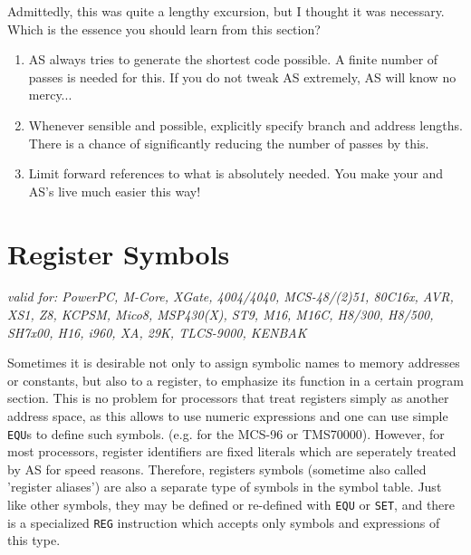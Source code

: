\documentclass[12pt,twoside]{report}
\makeatletter
\newcommand{\tty}[1]{{\tt #1}}
\newcommand{\ttindex}[1]{\index{#1@{\tt #1}}}
\makeatother
\begin{document}
Admittedly, this was quite a lengthy excursion, but I thought it was
necessary.  Which is the essence you should learn from this section?
\begin{enumerate}
\item{AS always tries to generate the shortest code possible.  A
      finite number of passes is needed for this.  If you do not tweak
      AS extremely, AS will know no mercy...}
\item{Whenever sensible and possible, explicitly specify branch and
      address lengths.  There is a chance of significantly reducing the
      number of passes by this.}
\item{Limit forward references to what is absolutely needed.  You make
      your and AS's live much easier this way!}
\end{enumerate}


\section{Register Symbols}
\label{SectRegSyms} \ttindex{register symbols}

{\em valid for: PowerPC, M-Core, XGate, 4004/4040, MCS-48/(2)51, 80C16x,
     AVR, XS1, Z8, KCPSM, Mico8, MSP430(X), ST9, M16, M16C, H8/300,
     H8/500, SH7x00, H16, i960, XA, 29K, TLCS-9000, KENBAK}

Sometimes it is desirable not only to assign symbolic names to memory
addresses or constants, but also to a register, to emphasize its function
in a certain program section.  This is no problem for processors that
treat registers simply as another address space, as this allows to use
numeric expressions and one can use simple \tty{EQU}s to define such
symbols.  (e.g. for the MCS-96 or TMS70000).  However, for most
processors, register identifiers are fixed literals which are seperately
treated by AS for speed reasons.  Therefore, registers symbols (sometime
also called 'register aliases') are also a separate type of symbols in
the symbol table.  Just like other symbols, they may be defined or re-defined
with \tty{EQU} or \tty{SET}, and there is a specialized \tty{REG} instruction
which accepts only symbols and expressions of this type.
\end{document}
